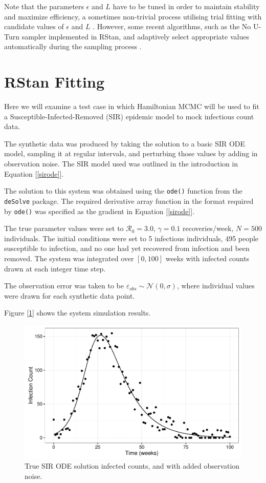     Note that the parameters $\epsilon$ and $L$ have to be tuned in order to maintain stability and maximize efficiency, a sometimes non-trivial process utilising trial fitting with candidate values of $\epsilon$ and $L$ \cite{Neal2011}. However, some recent algorithms, such as the No U-Turn sampler implemented in RStan, and adaptively select appropriate values automatically during the sampling process \cite{Hoffman2014}.
    

\section{RStan Fitting}

    Here we will examine a test case in which Hamiltonian MCMC will be used to fit a Susceptible-Infected-Removed (SIR) epidemic model to mock infectious count data.

    The synthetic data was produced by taking the solution to a basic SIR ODE model, sampling it at regular intervals, and perturbing those values by adding in observation noise. The SIR model used was outlined in the introduction in Equation [\ref{sirode}].

    The solution to this system was obtained using the \verb|ode()| function from the \verb|deSolve| package. The required derivative array function in the format required by \verb|ode()| was specified as the gradient in Equation [\ref{sirode}].

    The true parameter values were set to $\mathcal{R}_0 = 3.0$, $\gamma = 0.1$ recoveries/week, $N = 500$ individuals. The initial conditions were set to 5 infectious individuals, 495 people susceptible to infection, and no one had yet recovered from infection and been removed. The system was integrated over $[0,100]$ weeks with infected counts drawn at each integer time step.

    The observation error was taken to be $\varepsilon_{obs} \sim \mathcal{N}(0,\sigma)$, where individual values were drawn for each synthetic data point.

    Figure [\ref{mcmcdataplot}] shows the system simulation results.

    \begin{figure}
        \centering
        \includegraphics[width=\textwidth]{./images/dataplot.pdf}
        \caption{True SIR ODE solution infected counts, and with added observation noise. \label{mcmcdataplot}}
    \end{figure}

